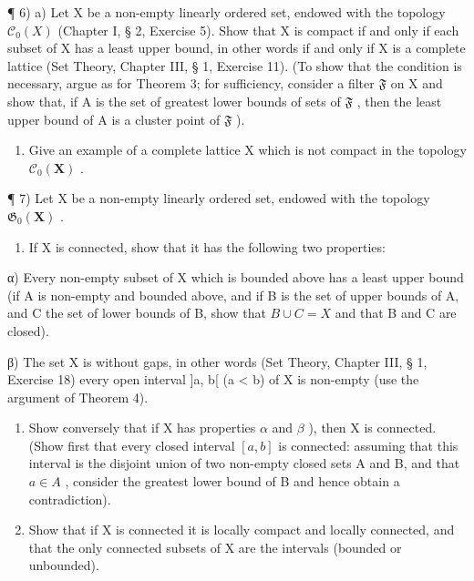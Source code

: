 ¶ 6) a) Let X be a non-empty linearly ordered set, endowed with the topology \(\mathcal{C}_{0}(X)\) (Chapter I, § 2, Exercise 5). Show that X is compact if and only if each subset of X has a least upper bound, in other words if and only if X is a complete lattice (Set Theory, Chapter III, § 1, Exercise 11). (To show that the condition is necessary, argue as for Theorem 3; for sufficiency, consider a filter \(\mathfrak{F}\) on X and show that, if A is the set of greatest lower bounds of sets of \(\mathfrak{F}\) , then the least upper bound of A is a cluster point of \(\mathfrak{F}\) ).

\begin{enumerate}
\def\labelenumi{\alph{enumi})}
\setcounter{enumi}{1}
\tightlist
\item
  Give an example of a complete lattice X which is not compact in the topology \(\mathcal{C}_{0}(\mathbf{X})\) .
\end{enumerate}

¶ 7) Let X be a non-empty linearly ordered set, endowed with the topology \(\mathfrak{G}_{\mathfrak{0}}(\mathbf{X})\) .

\begin{enumerate}
\def\labelenumi{\alph{enumi})}
\tightlist
\item
  If X is connected, show that it has the following two properties:
\end{enumerate}

α) Every non-empty subset of X which is bounded above has a least upper bound (if A is non-empty and bounded above, and if B is the set of upper bounds of A, and C the set of lower bounds of B, show that \(B \cup C = X\) and that B and C are closed).

β) The set X is without gaps, in other words (Set Theory, Chapter III, § 1, Exercise 18) every open interval {]}a, b{[} (a \textless{} b) of X is non-empty (use the argument of Theorem 4).

\begin{enumerate}
\def\labelenumi{\alph{enumi})}
\setcounter{enumi}{1}
\item
  Show conversely that if X has properties \(\alpha\) and \(\beta\) ), then X is connected. (Show first that every closed interval \([a, b]\) is connected: assuming that this interval is the disjoint union of two non-empty closed sets A and B, and that \(a \in A\) , consider the greatest lower bound of B and hence obtain a contradiction).
\item
  Show that if X is connected it is locally compact and locally connected, and that the only connected subsets of X are the intervals (bounded or unbounded).
\end{enumerate}

